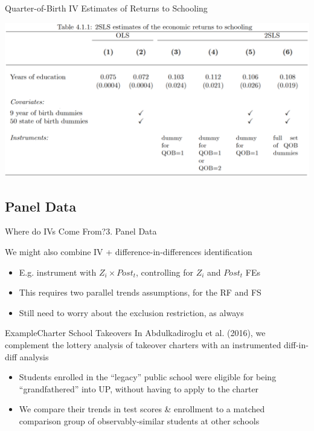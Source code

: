 \documentclass{beamer}
\begin{document}
\begin{frame}{Quarter-of-Birth IV Estimates of Returns to Schooling}

\begin{center}
\includegraphics[scale=0.32]{./lecture_includes/qob2.png}
\end{center}

\end{frame}

\subsection{Panel Data}
\begin{frame}{Where do IVs Come From?}{3. Panel Data}

We might also combine IV + difference-in-differences identification
\begin{itemize}
  \item E.g. instrument with $Z_i\times Post_t$, controlling for $Z_i$ and $Post_t$ FEs

  \item This requires two parallel trends assumptions, for the RF and FS

  \item Still need to worry about the exclusion restriction, as always
\end{itemize}
\end{frame}

\begin{frame}{Example}{Charter School Takeovers}
In Abdulkadiroglu et al. (2016), we complement the lottery analysis of takeover charters with an instrumented diff-in-diff analysis
\begin{itemize}
  \item Students enrolled in the ``legacy'' public school were eligible for being ``grandfathered'' into UP, without having to apply to the charter

  \item We compare their trends in test scores \& enrollment to a matched comparison group of observably-similar students at other schools
\end{itemize}
\end{frame}
\end{document}

